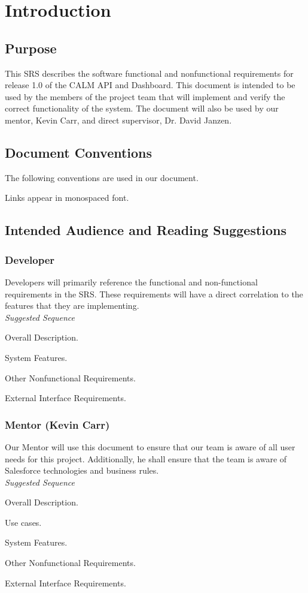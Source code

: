 \documentclass[12pt,oneside,letterpaper]{article}
\newenvironment{packed_enumerate}{ %
\vspace{-7mm}
\begin{enumerate}
  \setlength{\itemsep}{0pt}
  \setlength{\parskip}{0pt}
  \setlength{\parsep}{0pt}
}{\end{enumerate}
\vspace{-8mm}}
\begin{document}
\newpage

\section{Introduction}
\subsection{Purpose}
This SRS describes the software functional and nonfunctional requirements for release 1.0 of the CALM API and Dashboard. This document is intended to be used by the members of the project team that will implement and verify the correct functionality of the system. The document will also be used by our mentor, Kevin Carr, and direct supervisor, Dr. David Janzen.
\subsection{Document Conventions}
The following conventions are used in our document.\\
\begin{packed_enumerate}
\item Links appear in monospaced font.
\end{packed_enumerate}
\subsection{Intended Audience and Reading Suggestions}
\subsubsection{Developer}
Developers will primarily reference the functional and non-functional requirements in the SRS. These requirements will have a direct correlation to the features that they are implementing.\\
\textit{Suggested Sequence}\\
\begin{packed_enumerate}
\item Overall Description.
\item System Features.
\item Other Nonfunctional Requirements.
\item External Interface Requirements.
\end{packed_enumerate}
\subsubsection{Mentor (Kevin Carr)}
Our Mentor will use this document to ensure that our team is aware of 
all user needs for this project. Additionally, he shall ensure that 
the team is aware of Salesforce technologies and business rules.\\
\textit{Suggested Sequence}\\
\begin{packed_enumerate}
\item Overall Description.
\item Use cases.
\item System Features.
\item Other Nonfunctional Requirements.
\item External Interface Requirements.
\end{packed_enumerate}
\end{document}
